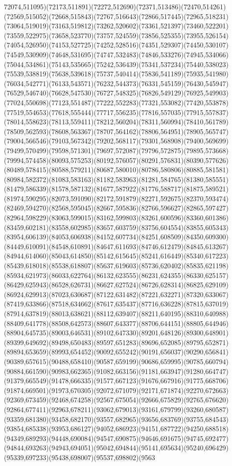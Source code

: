 \documentclass[conference]{IEEEtran}
\begin{document}
72074,511095)(72173,511891)(72272,512690)(72371,513486)(72470,514261)(72569,515052)(72668,515843)(72767,516643)(72866,517445)(72965,518231)(73064,519019)(73163,519812)(73262,520602)(73361,521397)(73460,522201)(73559,522975)(73658,523770)(73757,524559)(73856,525355)(73955,526154)(74054,526950)(74153,527725)(74252,528516)(74351,529307)(74450,530107)(74549,530909)(74648,531695)(74747,532483)(74846,533276)(74945,534066)(75044,534861)(75143,535665)(75242,536439)(75341,537234)(75440,538023)(75539,538819)(75638,539618)(75737,540414)(75836,541189)(75935,541980)(76034,542771)(76133,543571)(76232,544373)(76331,545159)(76430,545947)(76529,546740)(76628,547530)(76727,548325)(76826,549129)(76925,549903)(77024,550698)(77123,551487)(77222,552283)(77321,553082)(77420,553878)(77519,554653)(77618,555444)(77717,556235)(77816,557035)(77915,557837)(78014,558623)(78113,559411)(78212,560204)(78311,560994)(78410,561789)(78509,562593)(78608,563367)(78707,564162)(78806,564951)(78905,565747)(79004,566546)(79103,567342)(79202,568117)(79301,568908)(79400,569699)(79499,570499)(79598,571301)(79697,572087)(79796,572875)(79895,573668)(79994,574458)(80093,575253)(80192,576057)(80291,576831)(80390,577626)(80489,578415)(80588,579211)(80687,580010)(80786,580806)(80885,581581)(80984,582372)(81083,583163)(81182,583963)(81281,584765)(81380,585551)(81479,586339)(81578,587132)(81677,587922)(81776,588717)(81875,589521)(81974,590295)(82073,591090)(82172,591879)(82271,592675)(82370,593474)(82469,594270)(82568,595045)(82667,595836)(82766,596627)(82865,597427)(82964,598229)(83063,599015)(83162,599803)(83261,600596)(83360,601386)(83459,602181)(83558,602985)(83657,603759)(83756,604554)(83855,605343)(83954,606139)(84053,606938)(84152,607734)(84251,608509)(84350,609300)(84449,610091)(84548,610891)(84647,611693)(84746,612479)(84845,613267)(84944,614060)(85043,614850)(85142,615645)(85241,616449)(85340,617223)(85439,618018)(85538,618807)(85637,619603)(85736,620402)(85835,621198)(85934,621973)(86033,622764)(86132,623555)(86231,624355)(86330,625157)(86429,625943)(86528,626731)(86627,627524)(86726,628314)(86825,629109)(86924,629913)(87023,630687)(87122,631482)(87221,632271)(87320,633067)(87419,633866)(87518,634662)(87617,635437)(87716,636228)(87815,637019)(87914,637819)(88013,638621)(88112,639407)(88211,640195)(88310,640988)(88409,641778)(88508,642573)(88607,643377)(88706,644151)(88805,644946)(88904,645735)(89003,646531)(89102,647330)(89201,648126)(89300,648901)(89399,649692)(89498,650483)(89597,651283)(89696,652085)(89795,652871)(89894,653659)(89993,654452)(90092,655242)(90191,656037)(90290,656841)(90389,657615)(90488,658410)(90587,659199)(90686,659995)(90785,660794)(90884,661590)(90983,662365)(91082,663156)(91181,663947)(91280,664747)(91379,665549)(91478,666335)(91577,667123)(91676,667916)(91775,668706)(91874,669501)(91973,670305)(92072,671079)(92171,671874)(92270,672663)(92369,673459)(92468,674258)(92567,675054)(92666,675829)(92765,676620)(92864,677411)(92963,678211)(93062,679013)(93161,679799)(93260,680587)(93359,681380)(93458,682170)(93557,682965)(93656,683769)(93755,684543)(93854,685338)(93953,686127)(94052,686923)(94151,687722)(94250,688518)(94349,689293)(94448,690084)(94547,690875)(94646,691675)(94745,692477)(94844,693263)(94943,694051)(95042,694844)(95141,695634)(95240,696429)(95339,697233)(95438,698007)(95537,698802)(9563
\end{document}
